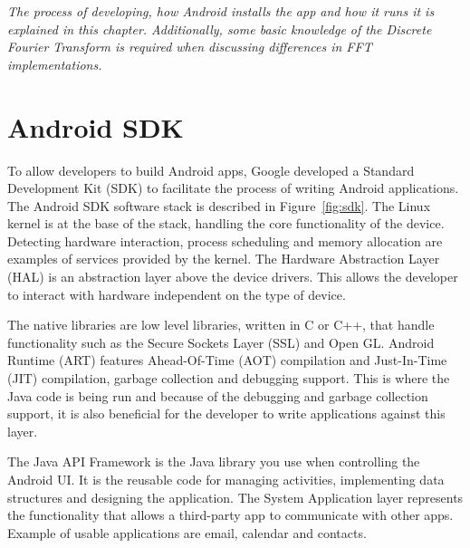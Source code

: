 \textit{The process of developing, how Android installs the app and how it runs it is explained in this chapter. Additionally, some basic knowledge of the Discrete Fourier Transform is required when discussing differences in FFT implementations.}

\section{Android SDK}
To allow developers to build Android apps, Google developed a Standard Development Kit (SDK) to facilitate the process of writing Android applications. The Android SDK software stack is described in Figure~\ref{fig:sdk}. The Linux kernel is at the base of the stack, handling the core functionality of the device. Detecting hardware interaction, process scheduling and memory allocation are examples of services provided by the kernel. The Hardware Abstraction Layer (HAL) is an abstraction layer above the device drivers. This allows the developer to interact with hardware independent on the type of device\cite{android:hal}.

The native libraries are low level libraries, written in C or C++, that handle functionality such as the Secure Sockets Layer (SSL) and Open GL\cite{komatineni2012pro}. Android Runtime (ART) features Ahead-Of-Time (AOT) compilation and Just-In-Time (JIT) compilation, garbage collection and debugging support\cite{android:sdk:stack}. This is where the Java code is being run and because of the debugging and garbage collection support, it is also beneficial for the developer to write applications against this layer.

The Java API Framework is the Java library you use when controlling the Android UI. It is the reusable code for managing activities, implementing data structures and designing the application. The System Application layer represents the functionality that allows a third-party app to communicate with other apps. Example of usable applications are email, calendar and contacts\cite{android:sdk:stack}.

